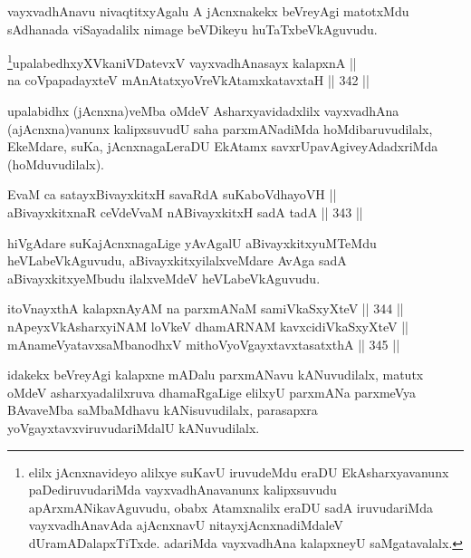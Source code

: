 \begin{artha}
vayxvadhAnavu nivaqtitxyAgalu A jAcnxnakekx beVreyAgi matotxMdu
sAdhanada viSayadalilx nimage beVDikeyu huTaTxbeVkAguvudu.
\end{artha}

\begin{shl}
\footnote{elilx jAcnxnavideyo alilxye suKavU iruvudeMdu eraDU
EkAsharxyavanunx paDediruvudariMda vayxvadhAnavanunx kalipxsuvudu
apArxmANikavAguvudu, obabx Atamxnalilx eraDU sadA iruvudariMda
vayxvadhAnavAda ajAcnxnavU nitayxjAcnxnadiMdaleV
dUramADalapxTiTxde. adariMda vayxvadhAna kalapxneyU saMgatavalalx.}upalabedhxyXVkaniVDatevxV vayxvadhAnasayx kalapxnA || \\
na coVpapadayxteV mAnAtatxyoVreVkAtamxkatavxtaH \hfill || 342 ||  
\end{shl}

\begin{artha}
upalabidhx (jAcnxna)veMba oMdeV Asharxyavidadxlilx
vayxvadhAna (ajAcnxna)vanunx kalipxsuvudU saha parxmANadiMda hoMdibaruvudilalx, EkeMdare, suKa, jAcnxnagaLeraDU EkAtamx
savxrUpavAgiveyAdadxriMda (hoMduvudilalx).
\end{artha}


\begin{shl}
EvaM ca satayxBivayxkitxH savaRdA suKaboVdhayoVH || \\
aBivayxkitxnaR ceVdeVvaM nABivayxkitxH sadA tadA \hfill || 343 ||  
\end{shl}

\begin{artha}
hiVgAdare suKajAcnxnagaLige yAvAgalU aBivayxkitxyuMTeMdu
heVLabeVkAguvudu, aBivayxkitxyilalxveMdare AvAga sadA
aBivayxkitxyeMbudu ilalxveMdeV heVLabeVkAguvudu.
\end{artha}

\begin{shl}
itoV\s nayxthA kalapxnAyAM na parxmANaM samiVkaSxyXteV \hfill || 344 ||  \\
nApeyxVkAsharxyiNAM loVkeV dhamARNAM kavxcidiVkaSxyXteV || \\
mAnameVyatavxsaMbanodhxV mithoVyoVgayxtavxtasatxthA \hfill || 345 ||  
\end{shl}

\begin{artha}
idakekx beVreyAgi kalapxne mADalu parxmANavu kANuvudilalx, matutx oMdeV asharxyadalilxruva dhamaRgaLige elilxyU parxmANa parxmeVya BAvaveMba saMbaMdhavu kANisuvudilalx, parasapxra yoVgayxtavxviruvudariMdalU kANuvudilalx.
\end{artha}

